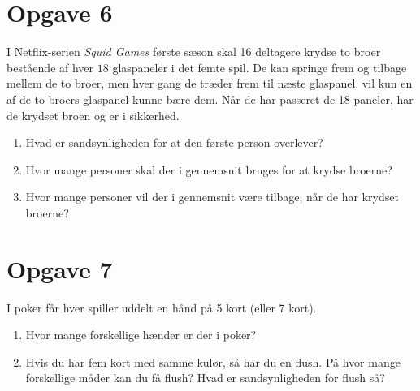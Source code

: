 \section*{Opgave 6}
I Netflix-serien \textit{Squid Games} første sæson skal 16 deltagere krydse to broer bestående af hver $18$ glaspaneler i det femte spil. De kan springe frem og tilbage mellem de to broer, men hver gang de træder frem til næste glaspanel, vil kun en af de to broers glaspanel kunne bære dem. Når de har passeret de 18 paneler, har de krydset broen og er i sikkerhed.
\begin{enumerate}[label=\roman*)]
\item Hvad er sandsynligheden for at den første person overlever?
\item Hvor mange personer skal der i gennemsnit bruges for at krydse broerne? 
\item Hvor mange personer vil der i gennemsnit være tilbage, når de har krydset broerne?
\end{enumerate}


\section*{Opgave 7}
I poker får hver spiller uddelt en hånd på 5 kort (eller 7 kort). 
\begin{enumerate}[label=\roman*)]
\item Hvor mange forskellige hænder er der i poker?
\item Hvis du har fem kort med samme kulør, så har du en flush. På hvor mange forskellige måder kan du få flush? Hvad er sandsynligheden for flush så?
\end{enumerate}
